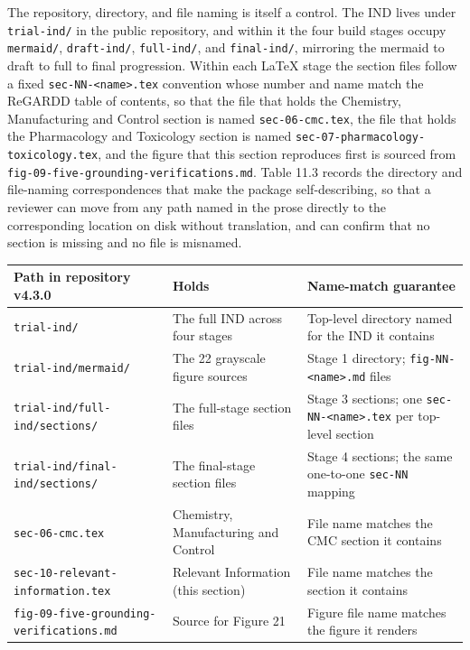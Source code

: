 The repository, directory, and file naming is itself a control. The IND lives under
\texttt{trial-ind/} in the public repository, and within it the four build stages
occupy \texttt{mermaid/}, \texttt{draft-ind/}, \texttt{full-ind/}, and
\texttt{final-ind/}, mirroring the mermaid to draft to full to final progression.
Within each LaTeX stage the section files follow a fixed
\texttt{sec-NN-<name>.tex} convention whose number and name match the ReGARDD table
of contents, so that the file that holds the Chemistry, Manufacturing and Control
section is named \texttt{sec-06-cmc.tex}, the file that holds the Pharmacology and
Toxicology section is named \texttt{sec-07-pharmacology-toxicology.tex}, and the
figure that this section reproduces first is sourced from
\texttt{fig-09-five-grounding-verifications.md}. Table 11.3 records the directory
and file-naming correspondences that make the package self-describing, so that a
reviewer can move from any path named in the prose directly to the corresponding
location on disk without translation, and can confirm that no section is missing
and no file is misnamed.

\noindent\begin{tabularx}{\textwidth}{L{7.5cm} L{3.5cm} Y}
\toprule
\textbf{Path in repository v4.3.0} & \textbf{Holds} & \textbf{Name-match guarantee} \\
\midrule
\texttt{trial-ind/} & The full IND across four stages & Top-level directory named for the IND it contains \\
\texttt{trial-ind/mermaid/} & The 22 grayscale figure sources & Stage 1 directory; \texttt{fig-NN-<name>.md} files \\
\texttt{trial-ind/full-ind/sections/} & The full-stage section files & Stage 3 sections; one \texttt{sec-NN-<name>.tex} per top-level section \\
\texttt{trial-ind/final-ind/sections/} & The final-stage section files & Stage 4 sections; the same one-to-one \texttt{sec-NN} mapping \\
\texttt{sec-06-cmc.tex} & Chemistry, Manufacturing and Control & File name matches the CMC section it contains \\
\texttt{sec-10-relevant-information.tex} & Relevant Information (this section) & File name matches the section it contains \\
\texttt{fig-09-five-grounding-verifications.md} & Source for Figure 21 & Figure file name matches the figure it renders \\
\bottomrule
\end{tabularx}

